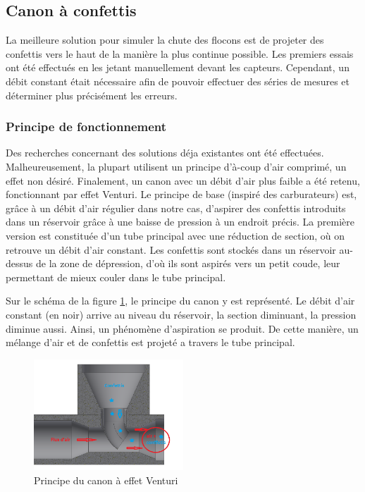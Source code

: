 \subsection{Canon à confettis}

La meilleure solution pour simuler la chute des flocons est de projeter des confettis vers le haut 
de la manière la plus continue possible. Les premiers essais ont été effectués en les jetant manuellement 
devant les capteurs. Cependant, un débit constant était nécessaire afin de pouvoir effectuer des séries de
mesures et déterminer plus précisément les erreurs. 

\subsubsection{Principe de fonctionnement}

Des recherches concernant des solutions déja existantes ont été effectuées. Malheureusement, la plupart 
utilisent un principe d'à-coup d'air comprimé, un effet non désiré. Finalement, un canon avec un 
débit d'air plus faible a été retenu, fonctionnant par effet Venturi.
Le principe de base (inspiré des carburateurs) est, grâce à un débit d’air régulier dans 
notre cas, d’aspirer des confettis introduits dans un réservoir grâce à une baisse de pression à un 
endroit précis. La première version est constituée d’un tube principal avec une réduction de section, où
on retrouve un débit d'air constant. Les confettis sont stockés dans un réservoir au-dessus de la zone 
de dépression, d'où ils sont aspirés vers un petit coude, leur permettant de mieux couler dans le 
tube principal.\par 
Sur le schéma de la figure \ref{fig:venturi}, le principe du canon y est représenté. Le débit d’air constant 
(en noir) arrive au niveau du réservoir, la section diminuant, la pression diminue aussi. Ainsi, un phénomène 
d’aspiration se produit. De cette manière, un mélange d'air et de confettis est projeté a travers le tube principal.

\begin{figure}[H]
    \centering
    \includegraphics[width=0.5\textwidth]{Images/photos_PGA/venturi_v1b.PNG}
    \caption{Principe du canon à effet Venturi}
    \label{fig:venturi}
\end{figure}


